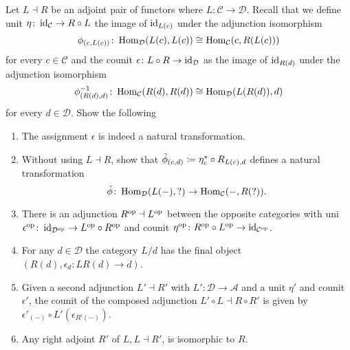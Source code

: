 \begin{Exercise}
    Let $ L \dashv R $ be an adjoint pair of functors where $ L \colon \mathcal{ C } \to \mathcal{ D } $.
    Recall that we define unit $ \eta \colon \operatorname{id}_{ \mathcal{ C } } \to R \circ L $ the image of $ \operatorname{id}_{ L ( c ) } $ under the adjunction isomorphism
    \[
        \phi_{ ( c , L ( c ) ) } \colon \operatorname{Hom}_{\mathcal{ D } } ( L ( c ) , L ( c ) ) \cong \operatorname{Hom}_{ \mathcal{ C } }( c, R ( L ( c ) ) )
    \]
    for every $ c \in \mathcal{ C } $ and the counit $ \epsilon \colon L \circ R \to \operatorname{id}_{ \mathcal D } $ as the image of $ \operatorname{id}_{ R ( d ) } $ under the adjunction isomorphism
    \[
        \phi^{ -1 }_{ ( R ( d ) , d ) } \colon \operatorname{Hom}_{ \mathcal{ C } } ( R ( d ) , R ( d ) ) \cong  \operatorname{Hom}_{ \mathcal{ D } }( L ( R ( d ) ) , d ) 
    \]
    for every $ d \in \mathcal{ D } $. 
    Show the following 
    \begin{enumerate}
        \item 
        The assignment $ \epsilon $ is indeed a natural transformation.
    
        \item 
        Without using $ L \dashv R $, show that $ \Tilde{ \phi }_{ ( c ,d ) } \coloneqq \eta_c^* \circ R_{ L ( c ) , d } $ defines a natural transformation
        \[
            \Tilde{ \phi } \colon \operatorname{Hom}_{ \mathcal{ D } }( L ( - ) , ?  ) \to \operatorname{Hom}_{ \mathcal{ C } } ( - , R ( ? ) ). 
        \]
    
        \item 
        There is an adjunction $ R^{ \operatorname{op} } \dashv L^{ \operatorname{op} } $ between the opposite categories with uni $ \epsilon^{ \operatorname{op} } \colon \operatorname{id}_{ \mathcal{ D }^{ \operatorname{op} } } \to L^{ \operatorname{op} } \circ R^{ \operatorname{op} } $ and counit $ \eta^{ \operatorname{op} } \colon R^{ \operatorname{op} } \circ L^{ \operatorname{op} } \to \operatorname{id}_{ \mathcal{ C  }^{\operatorname{op}} } $.
    
        \item 
        For any $ d \in \mathcal{ D } $ the category $ L / d $ has the final object $ ( R ( d ) , \epsilon_d \colon L R ( d ) \to d ) $.
    
        \item 
        Given a second adjunction $ L' \dashv R' $ with $ L' \colon \mathcal{ D} \to \mathcal{ A } $ and a unit $ \eta' $ and counit $ \epsilon' $, the counit of the composed adjunction $ L' \circ L \dashv R  \circ R' $ is given by $ \epsilon'_{ ( - ) } \circ L' ( \epsilon_{ R' ( - ) } ) $.
    
        \item 
        Any right adjoint $ R' $ of $ L , L \dashv R' $, is isomorphic to $ R $.
    \end{enumerate}
\end{Exercise}
